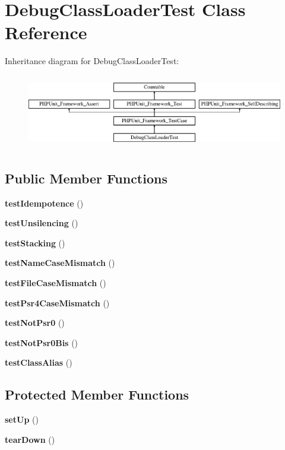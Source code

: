 \section{Debug\+Class\+Loader\+Test Class Reference}
\label{class_symfony_1_1_component_1_1_debug_1_1_tests_1_1_debug_class_loader_test}
Inheritance diagram for Debug\+Class\+Loader\+Test\+:\begin{figure}[H]
\begin{center}
\leavevmode
\includegraphics[height=3.303835cm]{class_symfony_1_1_component_1_1_debug_1_1_tests_1_1_debug_class_loader_test}
\end{center}
\end{figure}
\subsection*{Public Member Functions}
\begin{DoxyCompactItemize}
\item 
{\bf test\+Idempotence} ()
\item 
{\bf test\+Unsilencing} ()
\item 
{\bf test\+Stacking} ()
\item 
{\bf test\+Name\+Case\+Mismatch} ()
\item 
{\bf test\+File\+Case\+Mismatch} ()
\item 
{\bf test\+Psr4\+Case\+Mismatch} ()
\item 
{\bf test\+Not\+Psr0} ()
\item 
{\bf test\+Not\+Psr0\+Bis} ()
\item 
{\bf test\+Class\+Alias} ()
\end{DoxyCompactItemize}
\subsection*{Protected Member Functions}
\begin{DoxyCompactItemize}
\item 
{\bf set\+Up} ()
\item 
{\bf tear\+Down} ()
\end{DoxyCompactItemize}
